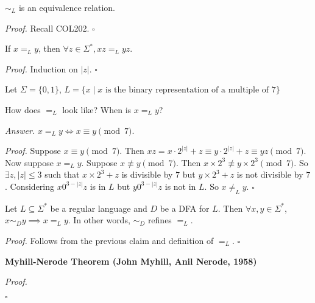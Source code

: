\documentclass[a4paper]{article}
\newenvironment{proof}{\begin{breakbox}\textit{Proof.}}{\hfill$\square$\end{breakbox}}
\newenvironment{ans}{\begin{breakbox}\textit{Answer.}}{\end{breakbox}}
\newcommand{\nl}{\vspace{0.2cm}\\}
\begin{document}
\begin{claim}
    $\sim_L$ is an equivalence relation.
\end{claim}
\begin{proof}
    Recall COL202.
\end{proof}

\begin{claim}
    If $x =_L y$, then $\forall z \in \Sigma^*, xz =_L yz$.
\end{claim}

\begin{proof}
    Induction on $|z|$.
\end{proof}

\begin{eg}
    Let $\Sigma = \{0, 1\}$, $L = \{x \mid x \text{ is the binary representation of a multiple of } 7\}$
\end{eg}

\begin{ques}
    How does $=_L$ look like? When is $x =_L y$?
\end{ques}

\begin{ans}
    $x =_L y \iff x \equiv y \pmod 7$.
        \begin{proof}
            Suppose $x \equiv y \pmod 7$. Then $xz = x \cdot 2^{|z|} + z \equiv y \cdot 2^{|z|} + z \equiv yz \pmod 7$.
            Now suppose $x =_L y$. Suppose $x \not\equiv y \pmod 7$. Then $x \times 2^3 \not\equiv y \times 2^3 \pmod 7$. So $\exists z, |z| \le 3$ such that $x \times 2^3 + z$ is
            divisible by $7$ but $y \times 2^3 + z$ is not
            divisible by $7$. Considering $x 0^{3-|z|}z$ is in $L$ but $y 0^{3-|z|}z$ is not in $L$. So $x \not=_L y$.
        \end{proof}
\end{ans}

\begin{theorem}
    Let $L \subseteq \Sigma^*$ be a regular language and $D$ be a DFA for $L$. Then $\forall x, y \in \Sigma^*$, $x \sim_D y \implies x =_L y$. In other words, $\sim_D$ refines $=_L$.
\end{theorem}

\begin{proof}
    Follows from the previous claim and definition of $=_L$.
\end{proof}

\begin{theorem}
    \textbf{Myhill-Nerode Theorem (John Myhill, Anil Nerode, 1958)}\nl

\end{theorem}

\begin{proof}

\end{proof}
\end{document}
